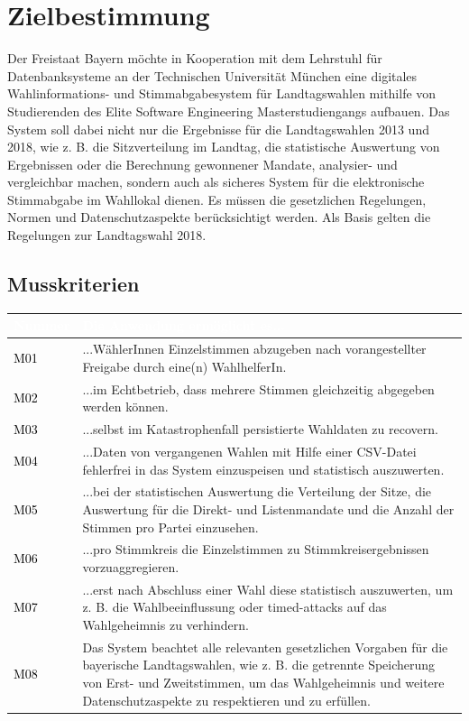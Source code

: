 \documentclass[a4paper,12pt]{article}
\newcommand\addrow[2]{\textcolor{black}{#1} &#2\\ \hline}
\newcommand\addheading[2]{\rowcolor{TUMBlue}\textcolor{white}{#1} & \textcolor{white}{#2}\\ \hline}
\newcommand\tabularhead{\begin{tabular}{|b|p{13cm}|}
\hline
}
\newenvironment{usecase}{\tabularhead}
{\hline\end{tabular}}
\begin{document}
 \setcounter{page}{2}

 \tableofcontents          %
 \clearpage
 
\section{Zielbestimmung}
Der Freistaat Bayern möchte in Kooperation mit dem Lehrstuhl für 
Datenbanksysteme an der Technischen Universität München eine digitales 
Wahlinformations- und Stimmabgabesystem für Landtagswahlen mithilfe von 
Studierenden des Elite Software Engineering Masterstudiengangs aufbauen.
%
Das System soll dabei nicht nur die Ergebnisse für die Landtagswahlen 
2013 und 2018, wie z. B. die Sitzverteilung im Landtag, die statistische Auswertung von Ergebnissen oder die Berechnung gewonnener
Mandate, analysier- und vergleichbar machen, sondern auch als sicheres System für die elektronische 
Stimmabgabe im Wahllokal dienen. 
%
Es müssen die gesetzlichen Regelungen, Normen und Datenschutzaspekte
berücksichtigt werden. Als Basis gelten die Regelungen zur
Landtagswahl 2018.


\subsection{Musskriterien}
\begin{usecase}
	\addheading{Nummer}{Die Anwendung ermöglicht es...} 
      \addrow{M01}{...WählerInnen Einzelstimmen abzugeben nach vorangestellter Freigabe durch eine(n) WahlhelferIn.}
      \addrow{M02}{...im Echtbetrieb, dass mehrere Stimmen gleichzeitig abgegeben werden können.}
      \addrow{M03}{...selbst im Katastrophenfall persistierte Wahldaten zu recovern.}
	\addrow{M04}{...Daten von vergangenen Wahlen mit Hilfe einer CSV-Datei fehlerfrei in das System einzuspeisen und statistisch auszuwerten.}
	\addrow{M05}{...bei der statistischen Auswertung die Verteilung der Sitze, die Auswertung für die Direkt- und Listenmandate und die Anzahl der Stimmen pro Partei einzusehen.}
	\addrow{M06}{...pro Stimmkreis die Einzelstimmen zu Stimmkreisergebnissen vorzuaggregieren.}
	\addrow{M07}{...erst nach Abschluss einer Wahl diese statistisch auszuwerten, um z. B. die Wahlbeeinflussung oder timed-attacks auf das Wahlgeheimnis zu verhindern.}
      \addrow{M08}{Das System beachtet alle relevanten gesetzlichen Vorgaben für die bayerische Landtagswahlen, wie z. B. die getrennte Speicherung von Erst- und Zweitstimmen, um das Wahlgeheimnis und weitere Datenschutzaspekte zu respektieren und zu erfüllen.}
\end{usecase}
\end{document}
